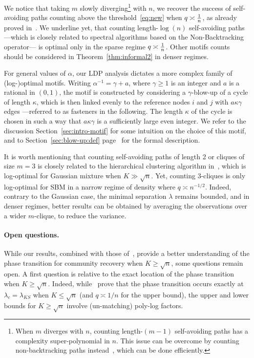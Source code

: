 \documentclass[final]{colt2026}
\newcommand{\1}{\mathbf{1}}
\begin{document}
We notice that taking $m$ slowly diverging\footnote{When $m$ diverges with $n$, counting length-$(m-1)$ self-avoiding paths has a complexity super-polynomial in $n$. This issue can be overcome by counting non-backtracking paths instead~\cite{pmlr-v291-chin25a}, which can be done efficiently.} with $n$, we recover the success of self-avoiding paths counting above the threshold~\eqref{eq:new} when $q\asymp {1\over n}$, as already proved in~\cite{pmlr-v291-chin25a}. We underline yet, that counting length-$\log(n)$  self-avoiding paths ---which is closely related to spectral algorithms based on the Non-Backtracking operator--- is optimal only in the sparse regime $q\asymp {1\over n}$. Other motifs counts should be considered in Theorem~\ref{thm:informal2} in denser regimes. 

For general values of $\alpha$, our LDP analysis dictates a more complex family  of (log-)optimal motifs. 
Writing $\alpha^{-1}= \gamma + a  $, where $\gamma\geq 1$ is an integer  and $a$ is a rational in $(0,1)$, the motif is constructed by considering a $\gamma$-blow-up of a cycle of length $\kappa$, which is then linked evenly to the reference nodes $i$ and $j$ with  $a\kappa\gamma$ edges ---referred to as fasteners in the following. The length $\kappa$ of the cycle is chosen in such a way that $a\kappa\gamma$ is a sufficiently  large even integer. We refer to the discussion Section~\ref{sec:intro-motif} for some intuition on the choice of this motif, and to Section~\ref{sec:blow-up:def} page~\pageref{sec:blow-up:def} for the formal description.





It is worth mentioning that counting self-avoiding paths of length 2 or cliques of size $m=3$ is closely related to the hierarchical clustering algorithm in~\cite{Even24}, which is log-optimal for Gaussian mixture when $K\gg \sqrt{n}$. Yet, counting $3$-cliques is only log-optimal for SBM in a narrow regime of density where $q\asymp n^{-1/2}$. Indeed, contrary to the Gaussian case, the minimal separation $\lambda$ remains bounded, and in denser regimes, better results can be obtained by averaging the observations over a wider $m$-clique, to reduce the variance. 

\paragraph{Open questions.}
While our results, combined with those of~\cite{pmlr-v291-chin25a}, provide a  better understanding of the phase transition for community recovery when $K\geq \sqrt{n}$, some questions remain open.
A first question is relative to the exact location of the phase transition when $K\geq \sqrt{n}$. 
Indeed, while~\cite{pmlr-v291-chin25a} prove that the phase transition occurs exactly at $\lambda_{c}=\lambda_{KS}$ when $K\leq \sqrt{n}$ (and $q\asymp 1/n$ for the upper bound),   the upper and lower bounds for $K\geq \sqrt{n}$ involve (un-matching) poly-log factors.
\end{document}
